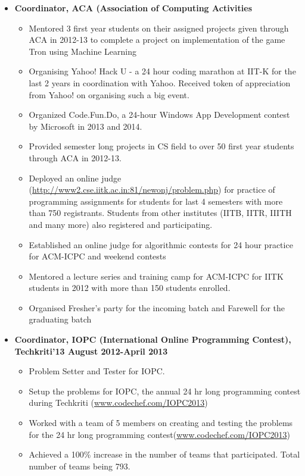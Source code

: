 \documentclass[margin,line]{resume}
\begin{document}
\begin{resume}
\begin{itemize}
  \item  \textbf{\textsf{Coordinator, ACA (Association of Computing Activities}}
    \begin{itemize}
      \item Mentored 3 first year students on their assigned projects given through ACA in 2012-13 to complete a project on implementation of the game Tron using Machine Learning
      \item Organising Yahoo! Hack U - a 24 hour coding marathon at IIT-K for the last 2 years in coordination with Yahoo. Received token of appreciation from Yahoo! on organising such a big event.
      \item Organized Code.Fun.Do, a 24-hour Windows App Development contest by Microsoft in 2013 and 2014.
      \item Provided semester long projects in CS field to over 50 first year students through ACA in 2012-13.
      \item Deployed an online judge (\url{http://www2.cse.iitk.ac.in:81/newonj/problem.php}) for practice of programming assignments for students for last 4 semesters with more than 750 registrants. Students from other institutes (IITB, IITR, IIITH and many more) also registered and participating.
      \item Established an online judge for algorithmic contests for 24 hour practice for ACM-ICPC and weekend contests
      \item Mentored a lecture series and training camp for ACM-ICPC for IITK students in 2012 with more than 150 students enrolled.
      \item Organised Fresher’s party for the incoming batch and Farewell for the graduating batch
    \end{itemize}

  \item  \textbf{\textsf{Coordinator, IOPC (International Online Programming Contest), Techkriti'13 August 2012-April 2013}}
    \begin{itemize}
    \item Problem Setter and Tester for IOPC.
    \item Setup the problems for IOPC, the annual 24 hr long programming contest during Techkriti (\url{www.codechef.com/IOPC2013})
    \item Worked with a team of 5 members on creating and testing the problems for the 24 hr long programming contest(\url{www.codechef.com/IOPC2013})
    \item Achieved a 100\% increase in the number of teams that participated. Total number of teams being 793.
    \end{itemize}
    

\end{itemize}
\end{resume}
\end{document}
